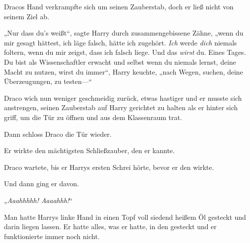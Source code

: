 Dracos Hand verkrampfte sich um seinen Zauberstab, doch er ließ nicht von seinem Ziel ab.

„Nur dass du’s weißt“, sagte Harry durch zusammengebissene Zähne, „wenn du mir gesagt hättest, ich läge falsch, hätte ich zugehört. \emph{Ich} werde \emph{dich} niemals foltern, wenn du mir zeigst, dass ich falsch liege. Und das \emph{wirst} du. Eines Tages. Du bist als Wissenschaftler erwacht und selbst wenn du niemals lernst, deine Macht zu nutzen, wirst du immer“, Harry keuchte, „nach Wegen, suchen, deine Überzeugungen, zu testen—“

Draco wich nun weniger geschmeidig zurück, etwas hastiger und er musste sich anstrengen, seinen Zauberstab auf Harry gerichtet zu halten als er hinter sich griff, um die Tür zu öffnen und aus dem Klassenraum trat.

Dann schloss Draco die Tür wieder.

Er wirkte den mächtigsten Schließzauber, den er kannte.

Draco wartete, bis er Harrys ersten Schrei hörte, bevor er den  wirkte.

Und dann ging er davon.

\later

„\emph{Aaahhhhh!  Aaaahhh!}“

Man hatte Harrys linke Hand in einen Topf voll siedend heißem Öl gesteckt und darin liegen lassen. Er hatte alles, was er hatte, in den  gesteckt und er funktionierte immer noch nicht.

